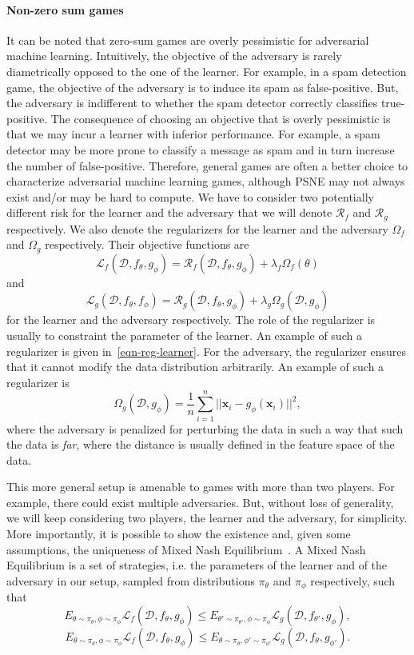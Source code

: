\paragraph{Non-zero sum games} It can be noted that zero-sum games are overly pessimistic for adversarial machine learning. Intuitively, the objective of the adversary is rarely diametrically opposed to the one of the learner. For example, in a spam detection game, the objective of the adversary is to induce its spam as false-positive. But, the adversary is indifferent to whether the spam detector correctly classifies true-positive. The consequence of choosing an objective that is overly pessimistic is that we may incur a learner with inferior performance. For example, a spam detector may be more prone to classify a message as spam and in turn increase the number of false-positive. Therefore, general games are often a better choice to characterize adversarial machine learning games, although PSNE may not always exist and/or may be hard to compute. We have to consider two potentially different risk for the learner and the adversary that we will denote $\mathcal{R}_f$ and $\mathcal{R}_g$ respectively. We also denote the regularizers for the learner and the adversary $\Omega_f$ and $\Omega_g$ respectively. Their objective functions are \[\mathcal{L}_f(\mathcal{D}, f_\theta, g_\phi)=\mathcal{R}_f(\mathcal{D},f_\theta,g_\phi) + \lambda_f\Omega_f(\theta)\] and \[\mathcal{L}_g(\mathcal{D},f_\theta,f_\phi)=\mathcal{R}_g(\mathcal{D},f_\theta,g_\phi)+\lambda_g\Omega_g(\mathcal{D},g_\phi)\] for the learner and the adversary respectively. The role of the regularizer is usually to constraint the parameter of the learner. An example of such a regularizer is given in~\eqref{eqn-reg-learner}. For the adversary, the regularizer ensures that it cannot modify the data distribution arbitrarily. An example of such a regularizer is
\[
\Omega_g(\mathcal{D}, g_\phi) = \dfrac{1}{n}\sum_{i=1}^n||\bm x_i - g_\phi(\bm x_i)||^2,
\]
where the adversary is penalized for perturbing the data in such a way that such the data is \textit{far}, where the distance is usually defined in the feature space of the data.

This more general setup is amenable to games with more than two players. For example, there could exist multiple adversaries. But, without loss of generality, we will keep considering two players, the learner and the adversary, for simplicity. More importantly, it is possible to show the existence and, given some assumptions, the uniqueness of Mixed Nash Equilibrium~\cite{bruckner_static_aml,dritsoula_game_ml}. A Mixed Nash Equilibrium is a set of strategies, i.e. the parameters of the learner and of the adversary in our setup, sampled from distributions $\pi_\theta$ and $\pi_\phi$ respectively, such that
\[
E_{\theta\sim\pi_\theta,\phi\sim\pi_{\phi}}\mathcal{L}_f(\mathcal{D},f_\theta,g_\phi)\leq E_{\theta' \sim\pi_{\theta'}, \phi\sim\pi_\phi}\mathcal{L}_g(\mathcal{D},f_{\theta'}, g_\phi),
\]
\[ 
E_{\theta\sim\pi_\theta,\phi\sim\pi_\phi}\mathcal{L}_f(\mathcal{D},f_\theta, g_\phi)\leq E_{\theta \sim\pi_\theta, \phi'\sim\pi_{\phi'}}\mathcal{L}_g(\mathcal{D},f_\theta, g_{\phi'}).
\]


